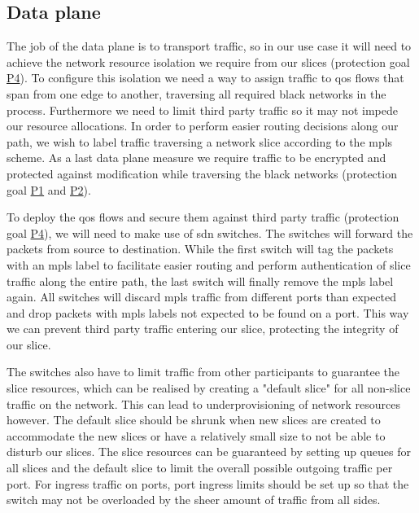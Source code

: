 \subsection{Data plane}
The job of the data plane is to transport traffic, so in our use case it will need to achieve the network resource isolation we require from our slices (protection goal \hyperref[P4]{P4}). To configure this isolation we need a way to assign traffic to \acrshort{qos} flows that span from one edge to another, traversing all required black networks in the process. Furthermore we need to limit third party traffic so it may not impede our resource allocations. In order to perform easier routing decisions along our path, we wish to label traffic traversing a network slice according to the \acrshort{mpls} scheme. As a last data plane measure we require traffic to be encrypted and protected against modification while traversing the black networks (protection goal \hyperref[P1]{P1} and \hyperref[P2]{P2}).

To deploy the \acrshort{qos} flows and secure them against third party traffic (protection goal \hyperref[P4]{P4}), we will need to make use of \acrshort{sdn} switches. The switches will forward the packets from source to destination. While the first switch will tag the packets with an \acrshort{mpls} label to facilitate easier routing and perform authentication of slice traffic along the entire path, the last switch will finally remove the \acrshort{mpls} label again. All switches will discard \acrshort{mpls} traffic from different ports than expected and drop packets with \acrshort{mpls} labels not expected to be found on a port. This way we can prevent third party traffic entering our slice, protecting the integrity of our slice.

The switches also have to limit traffic from other participants to guarantee the slice resources, which can be realised by creating a "default slice" for all non-slice traffic on the network. This can lead to underprovisioning of network resources however. The default slice should be shrunk when new slices are created to accommodate the new slices or have a relatively small size to not be able to disturb our slices. The slice resources can be guaranteed by setting up queues for all slices and the default slice to limit the overall possible outgoing traffic per port. For ingress traffic on ports, port ingress limits should be set up so that the switch may not be overloaded by the sheer amount of traffic from all sides.

